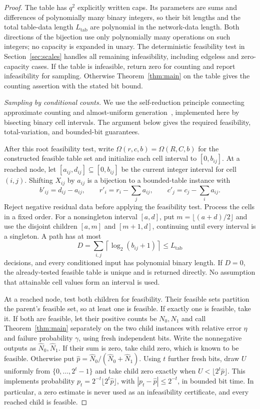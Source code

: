 \begin{proof}
The table has $q^2$ explicitly written caps. Its parameters are sums
and differences of polynomially many binary integers, so their bit
lengths and the total table-data length $L_{\mathrm{tab}}$ are polynomial
in the network-data length. Both directions of the bijection use only
polynomially many operations on such integers; no capacity is expanded
in unary. The deterministic feasibility test in Section~\ref{sec:scales}
handles all remaining infeasibility, including edgeless and zero-capacity
cases. If the table is infeasible, return zero for counting and report
infeasibility for sampling. Otherwise Theorem~\ref{thm:main} on the table
gives the counting assertion with the stated bit bound.

\emph{Sampling by conditional counts.}
We use the self-reduction principle connecting approximate counting
and almost-uniform generation~\cite[Theorem~6.3]{JVV1986}, implemented
here by bisecting binary cell intervals. The argument below gives the
required feasibility, total-variation, and bounded-bit guarantees.

After this root feasibility test, write $\Omega(r,c,b)=\Omega(R,C,b)$
for the constructed feasible table set and initialize each cell interval
to $[0,b_{ij}]$. At a reached node, let
$[a_{ij},d_{ij}]\subseteq[0,b_{ij}]$ be the current integer interval for
cell $(i,j)$.
Shifting $X_{ij}$ by $a_{ij}$ is a bijection to a bounded-table instance
with
\[
 b'_{ij}=d_{ij}-a_{ij},\qquad
 r'_i=r_i-\sum_j a_{ij},\qquad c'_j=c_j-\sum_i a_{ij}.
\]
Reject negative residual data before applying the feasibility test.
Process the cells in a fixed order. For a nonsingleton interval $[a,d]$,
put $m=\lfloor(a+d)/2\rfloor$ and use the disjoint children $[a,m]$ and
$[m+1,d]$, continuing until every interval is a singleton. A path has at
most
\[
 D=\sum_{i,j}\left\lceil\log_2(b_{ij}+1)\right\rceil
 \le L_{\mathrm{tab}}
\]
decisions, and every conditioned input has polynomial binary length.
If $D=0$, the already-tested feasible table is unique and is returned
directly. No assumption that attainable cell values form an interval
is used.

At a reached node, test both children for feasibility. Their feasible
sets partition the parent's feasible set, so at least one is feasible.
If exactly one is feasible, take it. If both are feasible, let their positive counts
be $N_0,N_1$ and call Theorem~\ref{thm:main} separately on the two child
instances with relative error $\eta$ and failure probability $\gamma$,
using fresh independent bits. Write the nonnegative outputs as
$\widehat N_0,\widehat N_1$. If their sum is zero, take child zero,
which is known to be feasible. Otherwise put
$\widehat p=\widehat N_0/(\widehat N_0+\widehat N_1)$. Using $t$ further fresh
bits, draw $U$ uniformly from $\{0,\ldots,2^t-1\}$ and take child zero
exactly when $U<\lfloor2^t\widehat p\rfloor$. This implements probability
$p_t=2^{-t}\lfloor2^t\widehat p\rfloor$, with $|p_t-\widehat p|\le2^{-t}$, in bounded
bit time. In particular, a zero estimate is never used as an
infeasibility certificate, and every reached child is feasible.


\end{proof}
